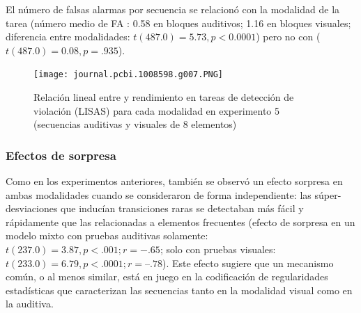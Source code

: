 El número de falsas alarmas por secuencia se relacionó con la modalidad de la tarea (número medio de FA : 0.58 en bloques auditivos; 1.16 en bloques visuales; diferencia entre modalidades: $t (487.0) = 5.73, p <0.0001$) pero no con \mdlbin ($t(487.0) = 0.08, p = .935$).

\begin{figure}[t!]
   \texttt{[image: journal.pcbi.1008598.g007.PNG]}
   \centering
   \caption{Relación lineal entre \mdlbin y rendimiento en tareas de detección de violación (LISAS) para cada modalidad en experimento 5 (secuencias auditivas y visuales de 8 elementos)}
   \label{PlosBIO-F7}
\end{figure}

\subsubsection*{Efectos de sorpresa}


Como en los experimentos anteriores, también se observó un efecto sorpresa en ambas modalidades cuando se consideraron de forma independiente: las súper-desviaciones que inducían transiciones raras se detectaban más fácil y rápidamente que las relacionadas a elementos frecuentes (efecto de sorpresa en un modelo mixto con pruebas auditivas solamente: $t(237.0) = 3.87, p < .001; r =-.65$; solo con pruebas visuales: $t (233.0) = 6.79, p < .0001; r = –.78$). Este efecto sugiere que un mecanismo común, o al menos similar, está en juego en la codificación de regularidades estadísticas que caracterizan las secuencias tanto en la modalidad visual como en la auditiva.


